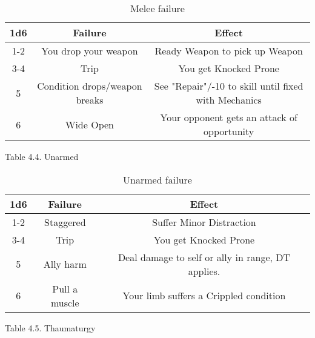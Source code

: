 \documentclass[11pt,a4paper,twocolumn]{book}
\begin{document}
    \begin{table*}[t]
        \centering
        \caption{Melee failure}
        \begin{tabular}{|c|c|c|}
           \hline
           \textbf{1d6}    & \textbf{Failure}          & \textbf{Effect} \\    \hline
                1-2         & You drop your weapon      & Ready Weapon to pick up Weapon          \\
                3-4         & Trip      & You get Knocked Prone             \\
                5           & Condition drops/weapon breaks & See "Repair"/-10 to skill until fixed with Mechanics \\
                6           & Wide Open & Your opponent gets an attack of opportunity      \\ \hline
        \end{tabular}
        \label{tab:my_label}
    \end{table*}
    
    Table 4.4. Unarmed
    
    \begin{table*}[t]
        \centering
        \caption{Unarmed failure}
        \begin{tabular}{|c|c|c|}
           \hline
           \textbf{1d6}    & \textbf{Failure}  & \textbf{Effect} \\    \hline
                1-2         & Staggered       & Suffer Minor Distraction            \\
                3-4         & Trip & You get Knocked Prone              \\
                5           & Ally harm & Deal damage to self or ally in range, DT applies.          \\
                6           & Pull a muscle  & Your limb suffers a Crippled condition      \\ \hline
        \end{tabular}
        \label{tab:my_label}
    \end{table*}
    
    Table 4.5. Thaumaturgy
    
\end{document}
